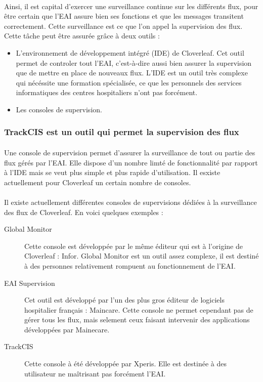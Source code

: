 			\paragraph{}%
			Ainsi, il est capital d'exercer une surveillance continue sur les différents
			flux, pour être certain que l'EAI assure bien ses fonctions et que les
			messages transitent correctement. Cette surveillance est ce que l'on appel la
			supervision des flux. Cette tâche peut être assurée grâce à deux outils :
			\begin{itemize}
			  \item L'environnement de développement intégré (IDE) de Cloverleaf. Cet
			  outil permet de controler tout l'EAI, c'est-à-dire aussi bien assurer la
			  supervision que de mettre en place de nouveaux flux. L'IDE est un outil
			  très complexe qui nécéssite une formation spécialisée, ce que les
			  personnels des services informatiques des centres hospitaliers n'ont pas
			  forcément.
			  \item Les consoles de supervision.
			\end{itemize}
			
		\subsubsection{TrackCIS est un outil qui permet la supervision des flux}
			\paragraph{}%
			Une console de supervision permet d'assurer la surveillance
			de tout ou partie des flux gérés par l'EAI. Elle dispose d'un
			nombre limté de fonctionnalité par rapport à l'IDE mais se veut plus simple
			et plus rapide d'utilisation. Il esxiste actuellement pour Cloverleaf un
			certain nombre de consoles.
			
			\paragraph{}%
			Il existe actuellement différentes consoles de supervisions dédiées à la
			surveillance des flux de Cloverleaf. En voici quelques exemples :
			\begin{description}
				\item[Global Monitor] Cette console est développée par le même éditeur qui
				est à l'origine de Cloverleaf : Infor. Global Monitor est un outil assez
				complexe, il est destiné à des personnes relativement rompuent au
				fonctionnement de l'EAI.
				\item[EAI Supervision] Cet outil est développé par l'un des plus gros
				éditeur de logiciels hospitalier français : Maincare. Cette console ne
				permet cependant pas de gérer tous les flux, mais selement ceux faisant
				intervenir des applications développées par Mainecare.
				\item[TrackCIS] Cette console à été développée par Xperis. Elle est destinée
				à des utilisateur ne maîtrisant pas forcément l'EAI.
			\end{description}
			
